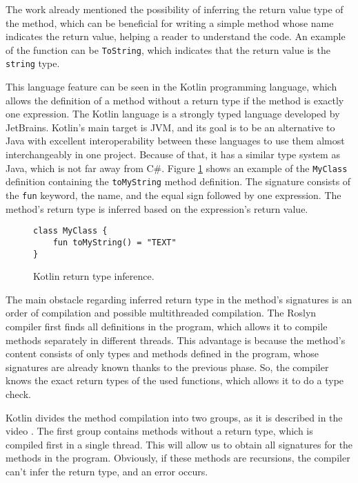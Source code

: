 The work already mentioned the possibility of inferring the return value type of the method, which can be beneficial for writing a simple method whose name indicates the return value, helping a reader to understand the code. 
An example of the function can be \texttt{ToString}, which indicates that the return value is the \texttt{string} type.
\par
This language feature can be seen in the Kotlin programming language, which allows the definition of a method without a return type if the method is exactly one expression. 
The Kotlin language is a strongly typed language developed by JetBrains. 
Kotlin’s main target is JVM, and its goal is to be an alternative to Java with excellent interoperability between these languages to use them almost interchangeably in one project. 
Because of that, it has a similar type system as Java, which is not far away from C\#. 
Figure \ref{img64:kotlin} shows an example of the \texttt{MyClass} definition containing the \texttt{toMyString} method definition. 
The signature consists of the \texttt{fun} keyword, the name, and the equal sign followed by one expression. 
The method's return type is inferred based on the expression's return value.
\begin{figure}[h!]
\begin{lstlisting}[style=csharp, mathescape=true]
class MyClass {
    fun toMyString() = "TEXT"
}
\end{lstlisting}
\caption{Kotlin return type inference.}
\label{img64:kotlin}
\end{figure}
\par
The main obstacle regarding inferred return type in the method's signatures is an order of compilation and possible multithreaded compilation.
The Roslyn compiler first finds all definitions in the program, which allows it to compile methods separately in different threads.
This advantage is because the method's content consists of only types and methods defined in the program, whose signatures are already known thanks to the previous phase.
So, the compiler knows the exact return types of the used functions, which allows it to do a type check.
\par
Kotlin divides the method compilation into two groups, as it is described in the video \cite{online:kotlinCompiler}. 
The first group contains methods without a return type, which is compiled first in a single thread. 
This will allow us to obtain all signatures for the methods in the program. 
Obviously, if these methods are recursions, the compiler can’t infer the return type, and an error occurs.
